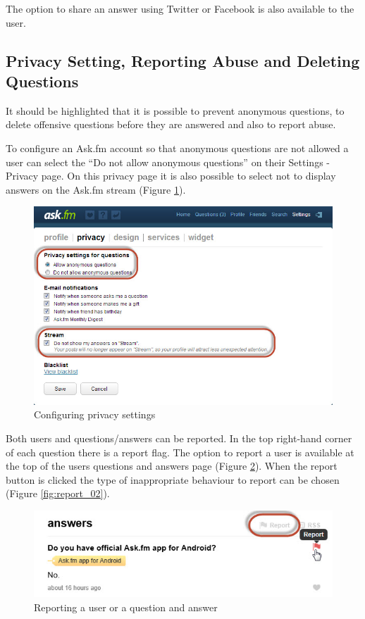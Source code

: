 The option to share an answer using Twitter or Facebook is also available to the user.

\subsection{Privacy Setting, Reporting Abuse and Deleting Questions}
It should be highlighted that it is possible to prevent anonymous questions, to delete offensive questions before they are answered and also to report abuse.

To configure an Ask.fm account so that anonymous questions are not allowed a user can select the ``Do not allow anonymous questions'' on their Settings - Privacy page. On this privacy page it is also possible to select not to display answers on the Ask.fm stream (Figure \ref{fig:privacy}).

\begin{figure}[h!]
	\centering
	\includegraphics[scale=0.5]{Figures/Chapter2/PrivacySettings.jpg}
	\caption{Configuring privacy settings}
	\label{fig:privacy}
\end{figure}

Both users and questions/answers can be reported. In the top right-hand corner of each question there is a report flag. The option to report a user is available at the top of the users questions and answers page (Figure \ref{fig:report_01}). When the report button is clicked the type of inappropriate behaviour to report can be chosen (Figure \ref{fig:report_02}).

\begin{figure}[h!]
	\centering
	\includegraphics[scale=0.5]{Figures/Chapter2/report_01.jpg}
	\caption{Reporting a user or a question and answer}
	\label{fig:report_01}
\end{figure}



